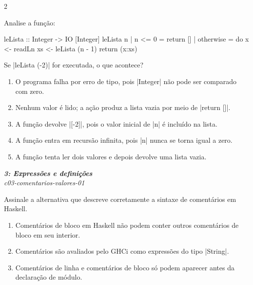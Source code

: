 \documentclass[a4paper,10pt,brazil]{article}
\begin{document}
\begin{multicols}{2}
\begin{flushright}
\end{flushright}
Analise a função:

\begin{haskellcode}
leLista :: Integer -> IO [Integer]
leLista n
  | n <= 0    = return []
  | otherwise = do
      x <- readLn
      xs <- leLista (n - 1)
      return (x:xs)
\end{haskellcode}

Se \haskellinline|leLista (-2)| for executada, o que acontece?

\begin{enumerate}
  \item O programa falha por erro de tipo, pois \haskellinline|Integer| não pode ser comparado com zero.

  \item Nenhum valor é lido; a ação produz a lista vazia por meio de \haskellinline|return []|.

  \item A função devolve \haskellinline|[-2]|, pois o valor inicial de \haskellinline|n| é incluído na lista.

  \item A função entra em recursão infinita, pois \haskellinline|n| nunca se torna igual a zero.

  \item A função tenta ler dois valores e depois devolve uma lista vazia.


\end{enumerate}

\begin{flushright}
  \footnotesize
  \textit{\textbf{3: Expressões e definições}}\\
  \textit{c03-comentarios-valores-01}\\

\end{flushright}
Assinale a alternativa que descreve corretamente a sintaxe de comentários em Haskell.

\begin{enumerate}
  \item Comentários de bloco em Haskell não podem conter outros comentários de bloco em seu interior.

  \item Comentários são avaliados pelo GHCi como expressões do tipo \haskellinline|String|.

  \item Comentários de linha e comentários de bloco só podem aparecer antes da declaração de módulo.


\end{enumerate}
\end{multicols}
\end{document}
